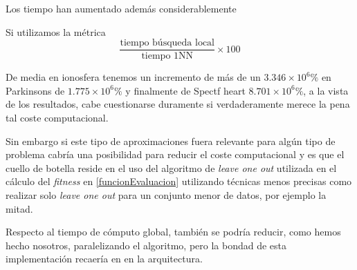 Los tiempo han aumentado además considerablemente 

Si utilizamos la métrica 
\begin{equation}\label{metricaNuevaTiempo}
    \frac{\text{tiempo búsqueda local}}{\text{tiempo 1NN}} 
    \times 100
\end{equation}

De media en ionosfera tenemos un incremento de más de un   $3.346 \times 10^6 \%$ en Parkinsons 
de $1.775 \times 10^6 \%$ y finalmente de 
Spectf heart 
$8.701 \times 10^6 \%$, 
a la vista de los resultados, cabe cuestionarse duramente si verdaderamente merece la pena tal coste computacional. 

Sin embargo si este tipo de aproximaciones fuera relevante para algún tipo de problema cabría una posibilidad para reducir el coste computacional y es que el cuello de botella reside en el uso del algoritmo de \textit{leave one out} utilizada en el cálculo del \textit{fitness} en \ref{funcionEvaluacion} utilizando técnicas menos precisas como
  realizar solo \textit{leave one out} para un conjunto menor de datos, por ejemplo la mitad.


Respecto al tiempo de cómputo global, también se podría reducir, como hemos hecho nosotros, paralelizando el algoritmo, pero la bondad de esta implementación recaería en en la arquitectura.

  

  





